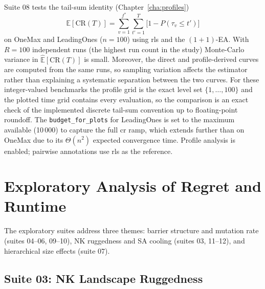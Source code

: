 Suite 08 tests the tail-sum identity (Chapter~\ref{cha:profiles})
\[
  \mathbb{E}[\text{CR}(T)]
  = \sum_{v=1}^{f^{*}} \sum_{t'=1}^{T}
  \bigl[1 - P(\tau_v \leq t')\bigr]
\]
on OneMax and LeadingOnes ($n=100$) using \acrshort{rls} and the $(1+1)$-EA.
With $R=100$ independent runs (the highest run count in the study) Monte-Carlo
variance in $\widehat{\mathbb{E}}[\text{CR}(T)]$ is small. Moreover, the direct
and profile-derived curves are computed from the same runs, so sampling
variation affects the estimator rather than explaining a systematic separation
between the two curves. For these integer-valued benchmarks the profile grid is
the exact level set $\{1,\ldots,100\}$ and the plotted time grid contains every
evaluation, so the comparison is an exact check of the implemented discrete
tail-sum convention up to floating-point roundoff. The
\texttt{budget\_for\_plots} for LeadingOnes is set to the
maximum available (10\,000) to capture the full \acrshort{cr} ramp, which
extends further than on OneMax due to its $\Theta(n^{2})$ expected convergence
time. Profile analysis is enabled; pairwise annotations use \acrshort{rls} as
the reference.

\section{Exploratory Analysis of Regret and Runtime}

The exploratory suites address three themes: barrier structure and mutation rate
(suites 04--06, 09--10), NK ruggedness and SA cooling (suites 03, 11--12),
and hierarchical size effects (suite 07).

\subsection{Suite 03: NK Landscape Ruggedness}



